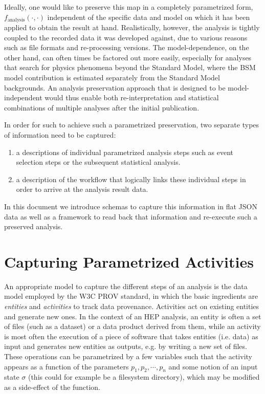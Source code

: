 \documentclass[a4paper]{jpconf}
\begin{document}
Ideally, one would like to preserve this map in a completely parametrized form, $f_\mathrm{analysis}(\cdot,\cdot)$ independent of the specific data and model on which it has been applied to obtain the result at hand. Realistically, however, the analysis is tightly coupled to the recorded data it was developed against, due to various reasons such as file formats and re-processing versions. The model-dependence, on the other hand, can often times be factored out more easily, especially for analyses that search for physics phenomena beyond the Standard Model, where the BSM model contribution is estimated separately from the Standard Model backgrounds. An analysis preservation approach that is designed to be model-independent would thus enable both re-interpretation and statistical combinations of multiple analyses after the initial publication.

In order for such to achieve such a parametrized preservation, two separate types of information need to be captured:

\begin{enumerate}
	\item a descriptions of individual parametrized analysis steps such as event selection steps or the subsequent statistical analysis.
	\item a description of the workflow that logically links these individual steps in order to arrive at the analysis result data.
\end{enumerate}

In this document we introduce schemas to capture this information in flat JSON data as well as a framework to read back that information and re-execute such a preserved analysis.

\section{Capturing Parametrized Activities}

An appropriate model to capture the different steps of an analysis is the data model employed by the W3C PROV standard\cite{w3c-prov-dm}, in which the basic ingredients are \emph{entities} and \emph{activities} to track data provenance. Activities act on existing entities and generate new ones. In the context of an HEP analysis, an entity is often a set of files (such as a dataset) or a data product derived from them, while an activity is most often the execution of a piece of software that takes entities (i.e. data) as input and generates new entities as outputs, e.g. by writing a new set of files.  These operations can be parametrized by a few variables such that the activity appears as a function of the parameters $p_1,p_2,\cdots,p_n$ and some notion of an input state $\sigma$ (this could for example be a filesystem directory), which may be modified as a side-effect of the function.
\end{document}
